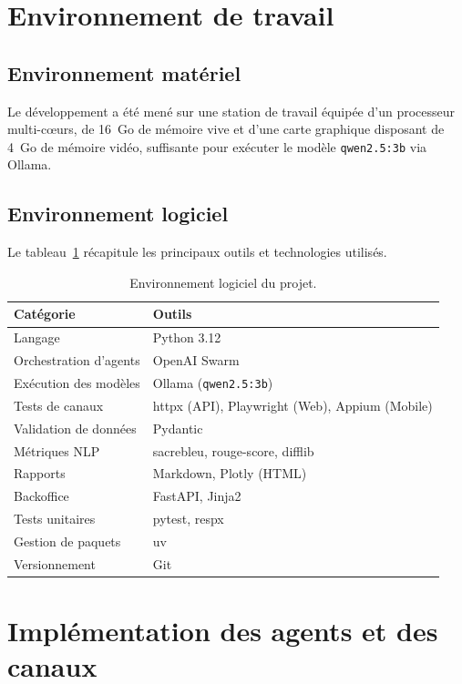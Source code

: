 \documentclass[12pt,a4paper,oneside]{report}
\begin{document}
\section{Environnement de travail}
\subsection{Environnement matériel}
Le développement a été mené sur une station de travail équipée d'un processeur
multi-cœurs, de 16~Go de mémoire vive et d'une carte graphique disposant de 4~Go de
mémoire vidéo, suffisante pour exécuter le modèle \texttt{qwen2.5:3b} via Ollama.

\subsection{Environnement logiciel}
Le tableau~\ref{tab:tools} récapitule les principaux outils et technologies utilisés.

\begin{table}[H]
\centering
\caption{Environnement logiciel du projet.}
\label{tab:tools}
\renewcommand{\arraystretch}{1.3}
\begin{tabularx}{\textwidth}{@{}l X@{}}
\toprule
\textbf{Catégorie} & \textbf{Outils} \\
\midrule
Langage & Python 3.12 \\
Orchestration d'agents & OpenAI Swarm \\
Exécution des modèles & Ollama (\texttt{qwen2.5:3b}) \\
Tests de canaux & httpx (API), Playwright (Web), Appium (Mobile) \\
Validation de données & Pydantic \\
Métriques NLP & sacrebleu, rouge-score, difflib \\
Rapports & Markdown, Plotly (HTML) \\
Backoffice & FastAPI, Jinja2 \\
Tests unitaires & pytest, respx \\
Gestion de paquets & uv \\
Versionnement & Git \\
\bottomrule
\end{tabularx}
\end{table}

\section{Implémentation des agents et des canaux}
\end{document}
